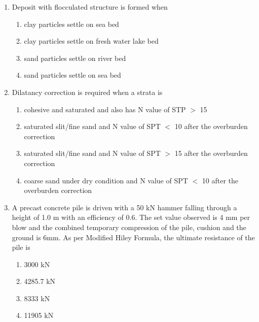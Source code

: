 \documentclass[journal,12pt,twocolumn]{IEEEtran}
\theoremstyle{remark}
\begin{document}
\begin{enumerate}
\item Deposit with flocculated structure is formed when
	\begin{enumerate}
		\item clay particles settle on sea bed
		\item clay particles settle on fresh water lake bed
		\item sand particles settle on river bed
		\item sand particles settle on sea bed
        \end{enumerate}

\item Dilatancy correction is required when a strata is 
	\begin{enumerate}
		\item cohesive and saturated and also has N value of STP $>$ 15
		\item saturated slit/fine sand and N value of SPT $<$ 10 after the overburden correction	
		\item saturated slit/fine sand and N value of SPT $>$ 15 after the overburden correction			 \item coarse sand under dry condition and N value of SPT $<$ 10 after the overburden correction	
	\end{enumerate}

\item A precast concrete pile is driven with a 50 kN hammer falling through a height of 1.0 m with an efficiency of 0.6. The set value observed is 4 mm per blow and the combined temporary compression of the pile, cushion and the ground is 6mm. As per Modified Hiley Formula, the ultimate resistance of the pile is
	\begin{enumerate}
		\item 3000 kN
		\item 4285.7 kN
	    \item 8333 kN
		\item 11905 kN
	\end{enumerate}






\end{enumerate}
\end{document}
